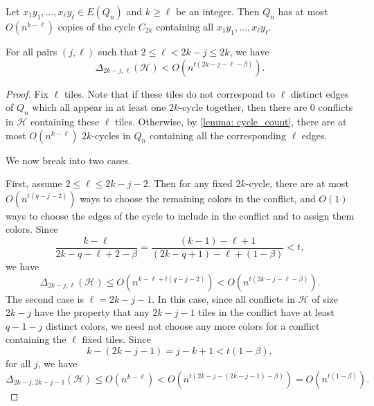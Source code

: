 \documentclass[10pt,a4paper]{amsart}
\newcommand\cH{{\mathcal H}}
\begin{document}
    \begin{lemma}\label{lemma: cycle_count}
        Let $x_1 y_1, \dots, x_\ell y_\ell \in E(Q_n)$ and $k\ge \ell$ be an integer. Then $Q_n$ has at most  $O(n^{k-\ell})$ copies of the cycle $C_{2k}$  containing all $x_1 y_1, \dots, x_\ell y_\ell$.
    \end{lemma}

        \begin{claim}
            For all pairs $(j,\ell)$ such that $2 \leq \ell < 2k - j \leq 2k$, we have
            $$
                \Delta_{2k-j, \ell} \left( \cH \right) < O \left( n^{t(2k - j - \ell -  \beta)} \right).
            $$
        \end{claim}

        \begin{proof}
            Fix $\ell$ tiles. Note that if these tiles do not correspond to $\ell$ distinct edges of $Q_n$ which all appear in at least one $2k$-cycle together, then there are 0 conflicts in $\cH$ containing these $\ell$ tiles. Otherwise, by \cref{lemma: cycle_count}, there are at most $O\left(n^{k-\ell}\right)$ $2k$-cycles in $Q_n$ containing all the corresponding $\ell$ edges. 

            We now break into two cases.
            
            First, assume $2 \leq \ell \leq 2k - j - 2$. Then for any fixed $2k$-cycle, there are at most $O\left( n^{t(q - j - 2)}\right)$ ways to choose the remaining colors in the conflict, and $O(1)$ ways to choose the edges of the cycle to include in the conflict and to assign them colors. Since  
         $$
                \frac{k - \ell}{2k - q - \ell + 2 - \beta}
                = \frac{(k - 1) - \ell + 1}{(2k - q + 1) - \ell +  (1 - \beta)}
                < t,
            $$ we have 
            $$
                \Delta_{2k-j, \ell} (\cH) \leq O\left( n^{k - \ell + t(q - j - 2)} \right) <  O \left( n^{t(2k - j - \ell - \beta)} \right).
            $$
             The second case is  $\ell = 2k - j - 1$. In this case, since all conflicts in $\cH$ of size $2k - j$ have the property that any $2k - j - 1$ tiles in the conflict have at least $q - 1 - j$ distinct colors, we need not choose any more colors for a conflict containing the $\ell$ fixed tiles. Since 
            \[ k - (2k - j - 1)  
                = j - k + 1
                < t(1 - \beta), \] for all $j$, we have
            \[\Delta_{2k-j, 2k-j-1} \left( \cH \right) 
                \leq O\left( n^{k - \ell} \right)
                < O\left(n^{t(2k - j - (2k - j - 1) - \beta)} \right)
                = O \left( n^{t(1 - \beta)} \right).\]
        \end{proof}
\end{document}
